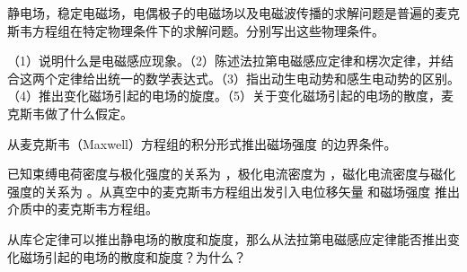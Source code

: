 \begin{question} 
静电场，稳定电磁场，电偶极子的电磁场以及电磁波传播的求解问题是普遍的麦克斯韦方程组在特定物理条件下的求解问题。分别写出这些物理条件。
\end{question}

\begin{question} 
（1）说明什么是电磁感应现象。（2）陈述法拉第电磁感应定律和楞次定律，并结合这两个定律给出统一的数学表达式。（3）指出动生电动势和感生电动势的区别。（4）推出变化磁场引起的电场的旋度。（5）关于变化磁场引起的电场的散度，麦克斯韦做了什么假定。
\end{question}

\begin{question} 
从麦克斯韦（Maxwell）方程组的积分形式推出磁场强度 的边界条件。
\end{question}

\begin{question} 
已知束缚电荷密度与极化强度的关系为 ，极化电流密度为 ，磁化电流密度与磁化强度的关系为 。从真空中的麦克斯韦方程组出发引入电位移矢量 和磁场强度 推出介质中的麦克斯韦方程组。
\end{question}

\begin{question} 
从库仑定律可以推出静电场的散度和旋度，那么从法拉第电磁感应定律能否推出变化磁场引起的电场的散度和旋度？为什么？
\end{question}